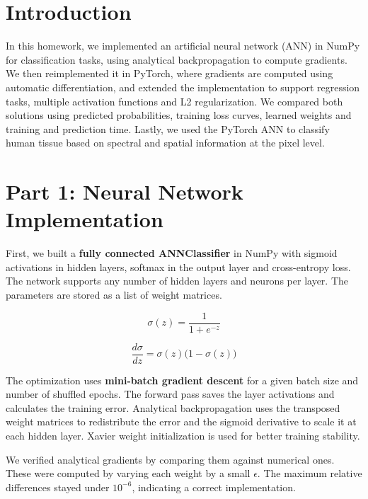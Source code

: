 \documentclass[fleqn,moreauthors,10pt]{ds_report}
\affiliation{\textit{ta5946@fri.uni-lj.si}}
\begin{document}
\flushbottom
\maketitle
\thispagestyle{empty}

\section*{Introduction}

In this homework, we implemented an artificial neural network (ANN) in NumPy for classification tasks, using analytical backpropagation to compute gradients. We then reimplemented it in PyTorch, where gradients are computed using automatic differentiation, and extended the implementation to support regression tasks, multiple activation functions and L2 regularization. We compared both solutions using predicted probabilities, training loss curves, learned weights and training and prediction time. Lastly, we used the PyTorch ANN to classify human tissue based on spectral and spatial information at the pixel level.

\section*{Part 1: Neural Network Implementation}

First, we built a \textbf{fully connected ANNClassifier} in NumPy with sigmoid activations in hidden layers, softmax in the output layer and cross-entropy loss. The network supports any number of hidden layers and neurons per layer. The parameters are stored as a list of weight matrices.

\begin{equation}
\sigma(z) = \frac{1}{1 + e^{-z}}
\end{equation}

\begin{equation}
\frac{d\sigma}{dz} = \sigma(z)\bigl(1 - \sigma(z)\bigr)
\end{equation}

The optimization uses \textbf{mini-batch gradient descent} for a given batch size and number of shuffled epochs. The forward pass saves the layer activations and calculates the training error. Analytical backpropagation uses the transposed weight matrices to redistribute the error and the sigmoid derivative to scale it at each hidden layer. Xavier weight initialization is used for better training stability.

We verified analytical gradients by comparing them against numerical ones. These were computed by varying each weight by a small $\epsilon$. The maximum relative differences stayed under $10^{-6}$, indicating a correct implementation.
\end{document}
